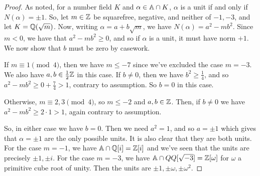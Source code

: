 \begin{proof}
    As noted, for a number field $K$ and $\alpha \in \AA \cap K$, $\alpha$ is a unit if and only if $N(\alpha) = \pm 1$. So, let $m \in \ZZ$ be squarefree, negative, and neither of $-1,-3$, and let $K = \QQ(\sqrt{m})$. Now, writing $\alpha = a+b\sqrt{m}$, we have $N(\alpha) = a^2-mb^2$. Since $m < 0$, we have that $a^2-mb^2 \geq 0$, and so if $\alpha$ is a unit, it must have norm $+1$. We now show that $b$ must be zero by casework.

    If $m \equiv 1 \pmod{4}$, then we have $m \leq -7$ since we've excluded the case $m=-3$. We also have $a,b \in \frac12\ZZ$ in this case. If $b \neq 0$, then we have $b^2 \geq \frac14$, and so $a^2-mb^2 \geq 0+\frac74 > 1$, contrary to assumption. So $b=0$ in this case.

    Otherwise, $m \equiv 2,3 \pmod{4}$, so $m \leq -2$ and $a,b \in \ZZ$. Then, if $b \neq 0$ we have $a^2-mb^2 \geq 2 \cdot 1 > 1$, again contrary to assumption.

    So, in either case we have $b=0$. Then we need $a^2 = 1$, and so $a = \pm 1$ which gives that $\alpha = \pm 1$ are the only possible units. It is also clear that they are both units. \\

    For the case $m=-1$, we have $\AA \cap \QQ[i] = \ZZ[i]$ and we've seen that the units are precisely $\pm 1, \pm i$. For the case $m=-3$, we have $\AA \cap QQ[\sqrt{-3}] = \ZZ[\omega]$ for $\omega$ a primitive cube root of unity. Then the units are $\pm 1, \pm \omega, \pm \omega^2$.
\end{proof}
